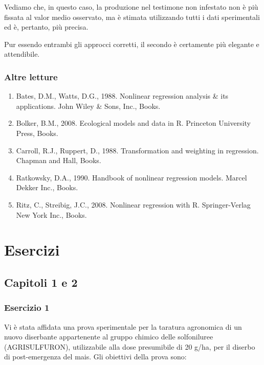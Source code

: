 \documentclass[a4paper,12pt,oneside]{book}
\providecommand{\tightlist}{%
  \setlength{\itemsep}{0pt}\setlength{\parskip}{0pt}}
\begin{document}
Vediamo che, in questo caso, la produzione nel testimone non infestato non è più fissata al valor medio osservato, ma è stimata utilizzando tutti i dati sperimentali ed è, pertanto, più precisa.

Pur essendo entrambi gli approcci corretti, il secondo è certamente più elegante e attendibile.

\hypertarget{altre-letture-11}{%
\subsection{Altre letture}\label{altre-letture-11}}

\begin{enumerate}
\def\labelenumi{\arabic{enumi}.}
\tightlist
\item
  Bates, D.M., Watts, D.G., 1988. Nonlinear regression analysis \& its applications. John Wiley \& Sons, Inc., Books.
\item
  Bolker, B.M., 2008. Ecological models and data in R. Princeton University Press, Books.
\item
  Carroll, R.J., Ruppert, D., 1988. Transformation and weighting in regression. Chapman and Hall, Books.
\item
  Ratkowsky, D.A., 1990. Handbook of nonlinear regression models. Marcel Dekker Inc., Books.
\item
  Ritz, C., Streibig, J.C., 2008. Nonlinear regression with R. Springer-Verlag New York Inc., Books.
\end{enumerate}

\hypertarget{esercizi}{%
\chapter{Esercizi}\label{esercizi}}

\hypertarget{capitoli-1-e-2}{%
\section{Capitoli 1 e 2}\label{capitoli-1-e-2}}

\hypertarget{esercizio-1}{%
\subsection{Esercizio 1}\label{esercizio-1}}

Vi è stata affidata una prova sperimentale per la taratura agronomica di un nuovo diserbante appartenente al gruppo chimico delle solfoniluree (AGRISULFURON), utilizzabile alla dose presumibile di 20 g/ha, per il diserbo di post-emergenza del mais. Gli obiettivi della prova sono:
\end{document}
